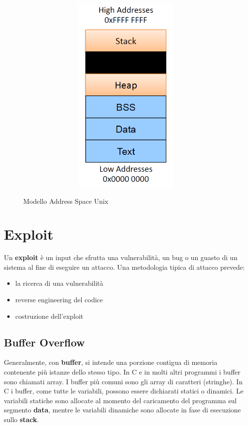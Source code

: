 \begin{figure}[htbp]
	\centering
	\subfigure
	{\includegraphics[height=10cm, width=13cm, keepaspectratio]{Immagini/sistemi_operativi/addr_space_unix.png}}
	\caption{Modello Address Space Unix \label{fig:addr_space_unix}} 	
\end{figure}

\section{Exploit}
Un \textbf{exploit} è un input che sfrutta una vulnerabilità, un bug o un guasto di un sistema al fine di eseguire un attacco. Una metodologia tipica di attacco prevede:
\begin{itemize}
  \item la ricerca di una vulnerabilità
  \item reverse engineering del codice
  \item	costruzione dell'exploit
\end{itemize}

\subsection{Buffer Overflow}
Generalmente, con \textbf{buffer}, si intende una porzione contigua di memoria contenente più istanze dello stesso tipo. In C e in molti altri programmi i buffer sono chiamati array. I buffer più comuni sono gli array di caratteri (stringhe).
In C i buffer, come tutte le variabili, possono essere dichiarati statici o dinamici. Le variabili statiche sono allocate al momento del caricamento del programma sul segmento \textbf{data}, mentre le variabili dinamiche sono allocate in fase di esecuzione sullo \textbf{stack}. \newline 

